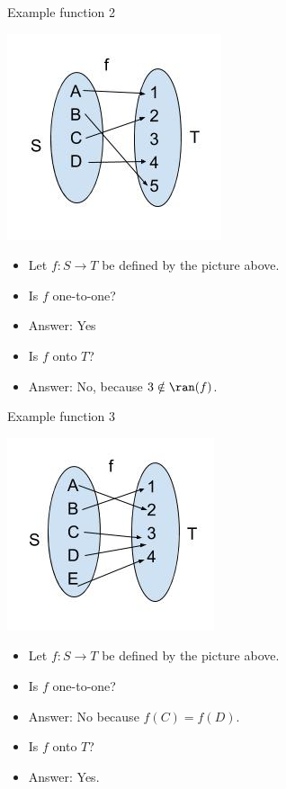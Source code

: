 \documentclass{beamer}
\begin{document}
\begin{frame}{Example function 2}
\begin{center}
\includegraphics[scale=0.25]{function2}
\end{center}

\begin{itemize}
\item Let $f:S\to T$ be defined by the picture above.
\item Is $f$ one-to-one?
\item Answer: Yes
\item Is $f$ onto $T$?
\item Answer: No, because $3\notin\ran(f)$.
\end{itemize}
\end{frame}

\begin{frame}{Example function 3}
\begin{center}
\includegraphics[scale=0.25]{function3}
\end{center}

\begin{itemize}
\item Let $f:S\to T$ be defined by the picture above.
\item Is $f$ one-to-one?
\item Answer: No because $f(C) = f(D)$.
\item Is $f$ onto $T$?
\item Answer: Yes.
\end{itemize}
\end{frame}
\end{document}
